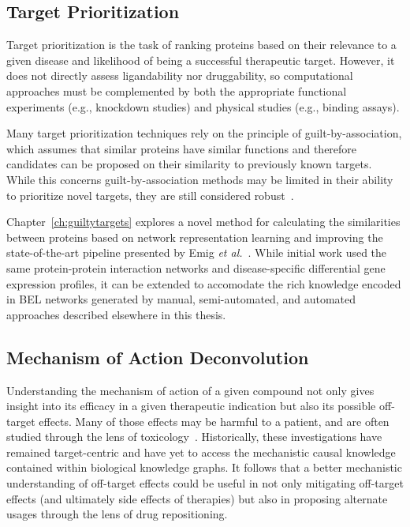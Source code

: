 \subsection{Target Prioritization}

Target prioritization is the task of ranking proteins based on their relevance to a given disease and likelihood of being a successful therapeutic target.
However, it does not directly assess ligandability nor druggability, so computational approaches must be complemented by both the appropriate functional experiments (e.g., knockdown studies) and physical studies (e.g., binding assays).

Many target prioritization techniques rely on the principle of guilt-by-association, which assumes that similar proteins have similar functions and therefore candidates can be proposed on their similarity to previously known targets.
While this concerns guilt-by-association methods may be limited in their ability to prioritize novel targets, they are still considered robust~\cite{Moreau2012}.

Chapter~\autoref{ch:guiltytargets} explores a novel method for calculating the similarities between proteins based on network representation learning and improving the state-of-the-art pipeline presented by Emig \textit{et al.}~\cite{Emig2013}.
While initial work used the same protein-protein interaction networks and disease-specific differential gene expression profiles, it can be extended to accomodate the rich knowledge encoded in \ac{BEL} networks generated by manual, semi-automated, and automated approaches described elsewhere in this thesis.

\subsection{Mechanism of Action Deconvolution}

Understanding the mechanism of action of a given compound not only gives insight into its efficacy in a given therapeutic indication but also its possible off-target effects.
Many of those effects may be harmful to a patient, and are often studied through the lens of toxicology~\cite{Lee2013}.
Historically, these investigations have remained target-centric and have yet to access the mechanistic causal knowledge contained within biological knowledge graphs.
It follows that a better mechanistic understanding of off-target effects could be useful in not only mitigating off-target effects (and ultimately side effects of therapies) but also in proposing alternate usages through the lens of drug repositioning.

